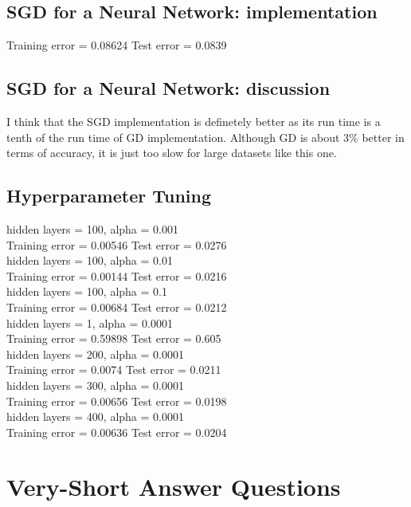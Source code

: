 \documentclass{article}
\begin{document}
\subsection{SGD for a Neural Network: implementation}

Training error =  0.08624
Test error     =  0.0839

\subsection{SGD for a Neural Network: discussion}

I think that the SGD implementation is definetely better as its run time is a tenth of the run time of GD implementation.
Although GD is about 3\% better in terms of accuracy, it is just too slow for large datasets like this one.

\subsection{Hyperparameter Tuning}

hidden layers = 100, alpha = 0.001\\
Training error =  0.00546
Test error     =  0.0276\\

hidden layers = 100, alpha = 0.01\\
Training error =  0.00144
Test error     =  0.0216\\

hidden layers = 100, alpha = 0.1\\
Training error =  0.00684
Test error     =  0.0212\\

hidden layers = 1, alpha = 0.0001\\
Training error =  0.59898
Test error     =  0.605\\

hidden layers = 200, alpha = 0.0001\\
Training error =  0.0074
Test error     =  0.0211\\

hidden layers = 300, alpha = 0.0001\\
Training error =  0.00656
Test error     =  0.0198\\

hidden layers = 400, alpha = 0.0001\\
Training error =  0.00636
Test error     =  0.0204\\

\section{Very-Short Answer Questions}
\end{document}
